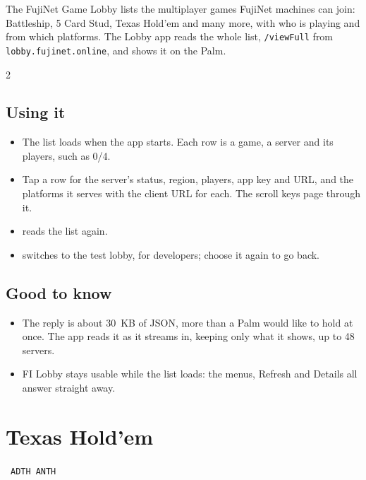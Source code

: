 The FujiNet Game Lobby lists the multiplayer games FujiNet machines can
join: Battleship, 5 Card Stud, Texas Hold'em and many more, with who is
playing and from which platforms. The Lobby app reads the whole list,
\texttt{/viewFull} from \texttt{lobby.fujinet.online}, and shows it on the
Palm.

\begin{center}
\hfill
{}\hfill
{}
\end{center}

\begin{multicols}{2}
\subsection*{Using it}
\begin{itemize}
  \item The list loads when the app starts. Each row is a game, a server
    and its players, such as \textsf{0/4}.
  \item Tap a row for the server's status, region, players, app key and URL,
    and the platforms it serves with the client URL for each. The scroll keys
    page through it.
  \item {} reads the list again.
  \item {} switches to the test lobby, for
    developers; choose it again to go back.
\end{itemize}

\subsection*{Good to know}
\begin{itemize}
  \item The reply is about 30~KB of JSON, more than a Palm would like to hold
    at once. The app reads it as it streams in, keeping only what it shows,
    up to 48 servers.
  \item FI Lobby stays usable while the list loads: the menus, Refresh and
    Details all answer straight away.
\end{itemize}
\end{multicols}

\newpage
\section{Texas Hold'em}\label{app:holdem}
  {\fnbadge\ \texttt{ADTH}\qquad \fibadge\ \texttt{ANTH}}

